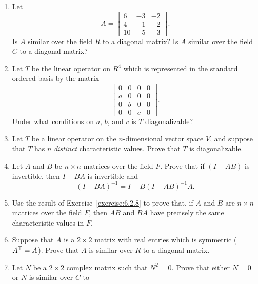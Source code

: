 \begin{enumerate}
    \item Let
        \begin{equation*}
            A=
            \begin{bmatrix}
                6 & -3 & -2 \\
                4 & -1 & -2 \\
                10 & -5 & -3
            \end{bmatrix}
            .
        \end{equation*}
        Is \(A\) similar over the field \(R\) to a diagonal matrix? Is \(A\) similar over the field \(C\) to a diagonal matrix?
    \item Let \(T\) be the linear operator on \(R^4\) which is represented in the standard ordered basis by the matrix
        \begin{equation*}
            \begin{bmatrix}
                0 & 0 & 0 & 0 \\
                a & 0 & 0 & 0 \\
                0 & b & 0 & 0 \\
                0 & 0 & c & 0
            \end{bmatrix}
            .
        \end{equation*}
        Under what conditions on \(a\), \(b\), and \(c\) is \(T\) diagonalizable?
    \item Let \(T\) be a linear operator on the \(n\)-dimensional vector space \(V\), and suppose that \(T\) has \(n\) \emph{distinct} characteristic values. Prove that \(T\) is diagonalizable.
    \item\label{exercise:6.2.8} Let \(A\) and \(B\) be \(n\times n\) matrices over the field \(F\). Prove that if \(\left(I-AB\right)\) is invertible, then \(I-BA\) is invertible and
        \begin{equation*}
            \left(I-BA\right)^{-1}=I+B\left(I-AB\right)^{-1}A.
        \end{equation*}
    \item Use the result of Exercise~\ref{exercise:6.2.8} to prove that, if \(A\) and \(B\) are \(n\times n\) matrices over the field \(F\), then \(AB\) and \(BA\) have precisely the same characteristic values in \(F\).
    \item Suppose that \(A\) is a \(2\times2\) matrix with real entries which is symmetric (\(A^\transpose=A\)). Prove that \(A\) is similar over \(R\) to a diagonal matrix.
    \item\label{exercise:6.2.11} Let \(N\) be a \(2\times2\) complex matrix such that \(N^2=0\). Prove that either \(N=0\) or \(N\) is similar over \(C\) to

\end{enumerate}
